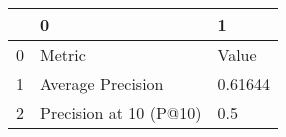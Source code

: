 \begin{tabular}{lll}
\toprule
{} &                       0 &        1 \\
\midrule
0 &                  Metric &    Value \\
1 &       Average Precision &  0.61644 \\
2 &  Precision at 10 (P@10) &      0.5 \\
\bottomrule
\end{tabular}
